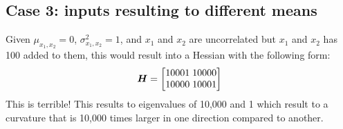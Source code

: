 \subsection{Case 3: inputs resulting to different means}
Given $\mu_{x_{1},x_{2}} = 0$, $\sigma_{x_{1},x_{2}}^2 = 1$, and $x_1$ and $x_2$ are uncorrelated but $x_1$ and $x_2$ has 100 added to them, this would result into a Hessian with the following form:
$$\matr{H} = \begin{bmatrix}
    10001\;10000\\
    10000\;10001\\
\end{bmatrix}$$
This is terrible! This results to eigenvalues of 10,000 and 1 which result to a curvature that is 10,000 times larger in one direction compared to another.